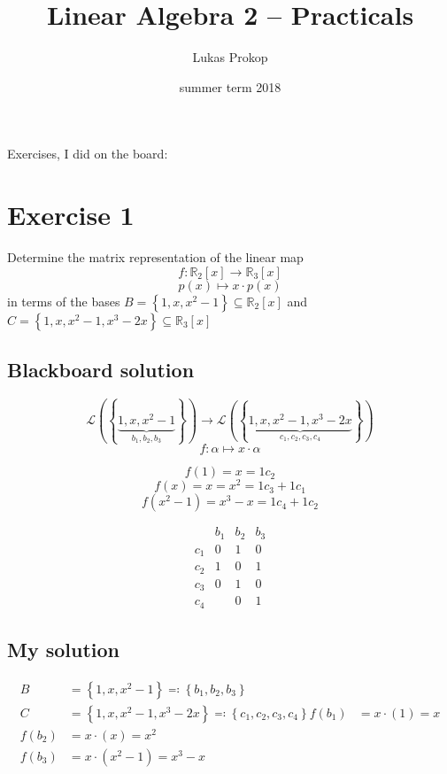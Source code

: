 \documentclass[a4paper]{article}
\title{Linear Algebra 2 -- Practicals}
\author{Lukas Prokop}
\date{summer term 2018}
\theoremstyle{definition}
\newcommand\set[1]{\left\{#1\right\}}
\begin{document}
\maketitle
\tableofcontents

\clearpage

Exercises, I did on the board: 

\section*{Exercise 1}
\begin{ex}
  Determine the matrix representation of the linear map
  \[ f: \mathbb R_2[x] \to \mathbb R_3[x] \]
  \[ p(x) \mapsto x \cdot p(x) \]
  in terms of the bases $B = \set{1, x, x^2 - 1} \subseteq \mathbb R_2[x]$ and $C = \set{1, x, x^2 - 1, x^3 - 2x} \subseteq \mathbb R_3[x]$
\end{ex}

\subsection{Blackboard solution}

\[ \mathcal L(\set{\underbrace{1, x, x^2-1}_{b_1, b_2, b_3}}) \to \mathcal L(\set{\underbrace{1, x, x^2-1, x^3 - 2x}_{c_1, c_2, c_3, c_4}}) \]
\[ f: \alpha \mapsto x \cdot \alpha \]

\[ f(1) = x = 1 c_2 \]
\[ f(x) = x = x^2 = 1c_3 + 1 c_1 \]
\[ f(x^2-1) = x^3 - x = 1 c_4 + 1 c_2 \]

\[
  \begin{matrix}
        & b_1 & b_2 & b_3 \\
  \hline
    c_1 & 0 & 1 & 0 \\
    c_2 & 1 & 0 & 1 \\
    c_3 & 0 & 1 & 0 \\
    c_4 &   & 0 & 1
  \end{matrix}
\]

\subsection{My solution}

\begin{align*}
  B &= \set{1, x, x^2 - 1} \eqqcolon \set{b_1, b_2, b_3} \\
  C &= \set{1, x, x^2 - 1, x^3 - 2x} \eqqcolon \set{c_1, c_2, c_3, c_4}
  f(b_1) &= x \cdot (1) = x \\
  f(b_2) &= x \cdot (x) = x^2 \\
  f(b_3) &= x \cdot (x^2 - 1) = x^3 - x
\end{align*}
\end{document}
